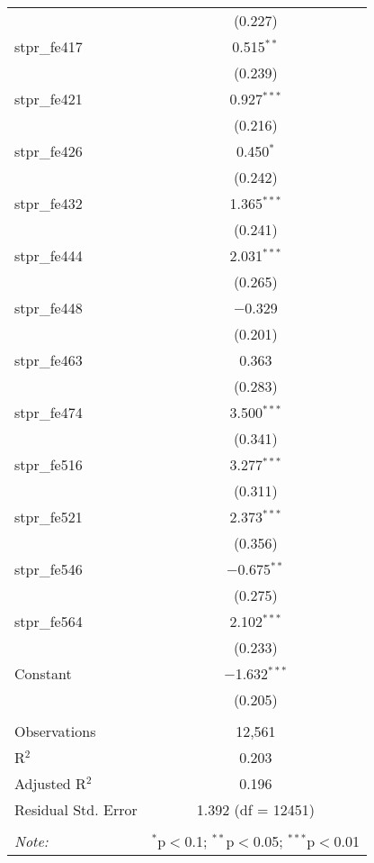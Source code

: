 \begin{table}[!htbp]
\begin{tabular}{@{\extracolsep{5pt}}lc}
  & (0.227) \\ 
  stpr\_fe417 & 0.515$^{**}$ \\ 
  & (0.239) \\ 
  stpr\_fe421 & 0.927$^{***}$ \\ 
  & (0.216) \\ 
  stpr\_fe426 & 0.450$^{*}$ \\ 
  & (0.242) \\ 
  stpr\_fe432 & 1.365$^{***}$ \\ 
  & (0.241) \\ 
  stpr\_fe444 & 2.031$^{***}$ \\ 
  & (0.265) \\ 
  stpr\_fe448 & $-$0.329 \\ 
  & (0.201) \\ 
  stpr\_fe463 & 0.363 \\ 
  & (0.283) \\ 
  stpr\_fe474 & 3.500$^{***}$ \\ 
  & (0.341) \\ 
  stpr\_fe516 & 3.277$^{***}$ \\ 
  & (0.311) \\ 
  stpr\_fe521 & 2.373$^{***}$ \\ 
  & (0.356) \\ 
  stpr\_fe546 & $-$0.675$^{**}$ \\ 
  & (0.275) \\ 
  stpr\_fe564 & 2.102$^{***}$ \\ 
  & (0.233) \\ 
  Constant & $-$1.632$^{***}$ \\ 
  & (0.205) \\ 
 \hline \\[-1.8ex] 
Observations & 12,561 \\ 
R$^{2}$ & 0.203 \\ 
Adjusted R$^{2}$ & 0.196 \\ 
Residual Std. Error & 1.392 (df = 12451) \\ 
\hline 
\hline \\[-1.8ex] 
\textit{Note:}  & \multicolumn{1}{r}{$^{*}$p$<$0.1; $^{**}$p$<$0.05; $^{***}$p$<$0.01} \\ 
\end{tabular} 
\end{table} 
